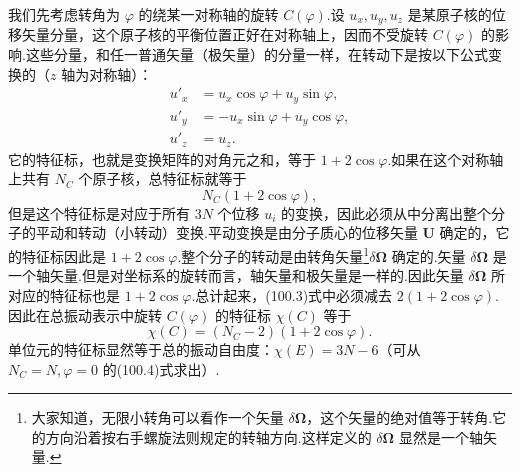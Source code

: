 我们先考虑转角为 $\varphi$ 的绕某一对称轴的旋转 $C(\varphi)$.设 $u_x,u_y,u_z$ 是某原子核的位移矢量分量，这个原子核的平衡位置正好在对称轴上，因而不受旋转 $C(\varphi)$ 的影响.这些分量，和任一普通矢量（极矢量）的分量一样，在转动下是按以下公式变换的（$z$ 轴为对称轴）：
\begin{equation*}
\begin{aligned}
  u'_x&=u_x\cos\varphi+u_y\sin\varphi,\\
  u'_y&=-u_x\sin\varphi+u_y\cos\varphi,\\
  u'_z&=u_z.
\end{aligned}
\end{equation*}
它的特征标，也就是变换矩阵的对角元之和，等于 $1+2\cos\varphi$.如果在这个对称轴上共有 $N_C$ 个原子核，总特征标就等于
\begin{equation}
  N_C(1+2\cos\varphi),
\end{equation}
但是这个特征标是对应于所有 $3N$ 个位移 $u_i$ 的变换，因此必须从中分离出整个分子的平动和转动（小转动）变换.平动变换是由分子质心的位移矢量 $\boldsymbol{U}$ 确定的，它的特征标因此是 $1+2\cos\varphi$.整个分子的转动是由转角矢量\footnote{大家知道，无限小转角可以看作一个矢量 $\delta\boldsymbol{\Omega}$，这个矢量的绝对值等于转角.它的方向沿着按右手螺旋法则规定的转轴方向.这样定义的 $\delta\boldsymbol{\Omega}$ 显然是一个轴矢量.}$\delta\boldsymbol{\Omega}$ 确定的.矢量 $\delta\boldsymbol{\Omega}$ 是一个轴矢量.但是对坐标系的旋转而言，轴矢量和极矢量是一样的.因此矢量 $\delta\boldsymbol{\Omega}$ 所对应的特征标也是 $1+2\cos\varphi$.总计起来，(100.3)式中必须减去 $2(1+2\cos\varphi)$.因此在总振动表示中旋转 $C(\varphi)$ 的特征标 $\chi(C)$ 等于
\begin{equation}
  \chi(C)=(N_C-2)(1+2\cos\varphi).
\end{equation}
单位元的特征标显然等于总的振动自由度：$\chi(E)=3N-6$（可从 $N_C=N,\varphi=0$ 的(100.4)式求出）.

